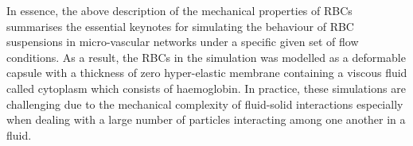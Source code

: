 \noindent In essence, the above description of the mechanical properties of RBCs summarises the essential keynotes for simulating the behaviour of RBC suspensions in micro-vascular networks under a specific given set of flow conditions. As a result, the RBCs in the simulation was modelled as a deformable capsule with a thickness of zero hyper-elastic membrane containing a viscous fluid called cytoplasm which consists of haemoglobin. In practice, these simulations are challenging due to the mechanical complexity of fluid-solid interactions especially when dealing with a large number of particles interacting among one another in a fluid.